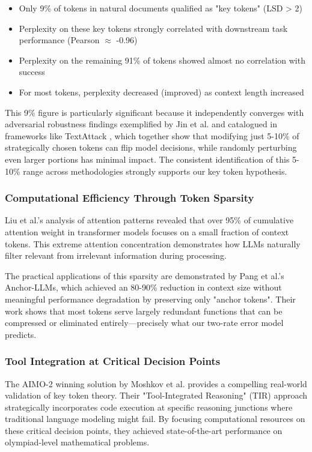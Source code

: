 \documentclass{article}
\begin{document}
\begin{itemize}
\item Only 9\% of tokens in natural documents qualified as "key tokens" (LSD > 2)
\item Perplexity on these key tokens strongly correlated with downstream task performance (Pearson $\approx$ -0.96)
\item Perplexity on the remaining 91\% of tokens showed almost no correlation with success
\item For most tokens, perplexity decreased (improved) as context length increased
\end{itemize}

This 9\% figure is particularly significant because it independently converges with adversarial robustness findings exemplified by Jin et al. \citep{jin2020textfooler} and catalogued in frameworks like TextAttack \citep{morris2022textattack}, which together show that modifying just 5-10\% of strategically chosen tokens can flip model decisions, while randomly perturbing even larger portions has minimal impact. The consistent identification of this 5-10\% range across methodologies strongly supports our key token hypothesis.

\subsubsection{Computational Efficiency Through Token Sparsity}

Liu et al.'s \citep{liu2023attention} analysis of attention patterns revealed that over 95\% of cumulative attention weight in transformer models focuses on a small fraction of context tokens. This extreme attention concentration demonstrates how LLMs naturally filter relevant from irrelevant information during processing.

The practical applications of this sparsity are demonstrated by Pang et al.'s \citep{pang2024anchor} Anchor-LLMs, which achieved an 80-90\% reduction in context size without meaningful performance degradation by preserving only "anchor tokens". Their work shows that most tokens serve largely redundant functions that can be compressed or eliminated entirely—precisely what our two-rate error model predicts.

\subsubsection{Tool Integration at Critical Decision Points}

The AIMO-2 winning solution by Moshkov et al. \citep{moshkov2025aimo} provides a compelling real-world validation of key token theory. Their "Tool-Integrated Reasoning" (TIR) approach strategically incorporates code execution at specific reasoning junctions where traditional language modeling might fail. By focusing computational resources on these critical decision points, they achieved state-of-the-art performance on olympiad-level mathematical problems.
\end{document}
